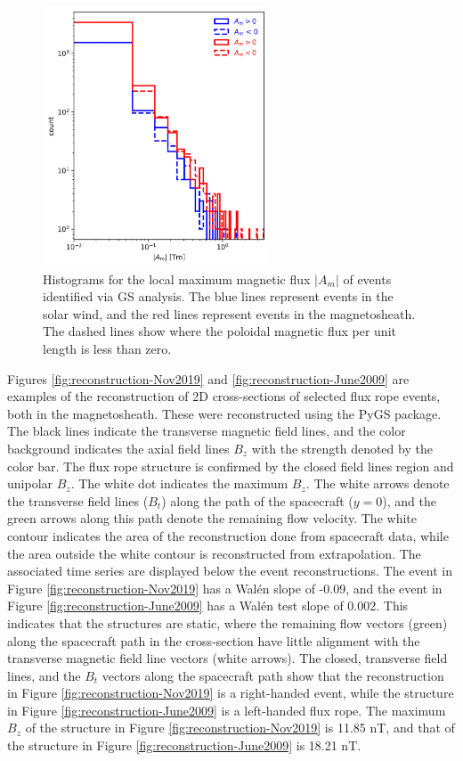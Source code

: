 \begin{figure}
    \centering
    \includegraphics[width=0.6\textwidth]{Figures/Histograms/histogram_Asplit.png}
    \caption{Histograms for the local maximum magnetic flux $|A_m|$ of events identified via GS analysis. The blue lines represent events in the solar wind, and the red lines represent events in the magnetosheath. The dashed lines show where the poloidal magnetic flux per unit length is less than zero.}
    \label{fig:histogram-Asplit}
\end{figure}



Figures \ref{fig:reconstruction-Nov2019} and \ref{fig:reconstruction-June2009} are examples of the reconstruction of 2D cross-sections of selected flux rope events, both in the magnetosheath. These were reconstructed using the PyGS package. The black lines indicate the transverse magnetic field lines, and the color background indicates the axial field lines $B_z$ with the strength denoted by the color bar. The flux rope structure is confirmed by the closed field lines region and unipolar $B_z$. The white dot indicates the maximum $B_z$. The white arrows denote the transverse field lines ($B_t$) along the path of the spacecraft ($y=0$), and the green arrows along this path denote the remaining flow velocity. The white contour indicates the area of the reconstruction done from spacecraft data, while the area outside the white contour is reconstructed from extrapolation. The associated time series are displayed below the event reconstructions. The event in Figure \ref{fig:reconstruction-Nov2019} has a Wal\'en slope of -0.09, and the event in Figure \ref{fig:reconstruction-June2009} has a Wal\'en test slope of 0.002. This indicates that the structures are static, where the remaining flow vectors (green) along the spacecraft path in the cross-section have little alignment with the transverse magnetic field line vectors (white arrows). The closed, transverse field lines, and the $B_t$ vectors along the spacecraft path show that the reconstruction in Figure \ref{fig:reconstruction-Nov2019} is a right-handed event, while the structure in Figure \ref{fig:reconstruction-June2009} is a left-handed flux rope. The maximum $B_z$ of the structure in Figure \ref{fig:reconstruction-Nov2019} is 11.85 nT, and that of the structure in Figure \ref{fig:reconstruction-June2009} is 18.21 nT. 

